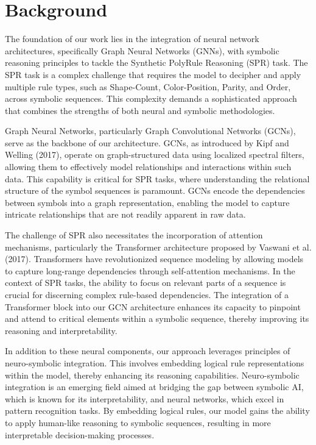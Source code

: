 \documentclass{article}
\begin{document}
\section{Background}
The foundation of our work lies in the integration of neural network architectures, specifically Graph Neural Networks (GNNs), with symbolic reasoning principles to tackle the Synthetic PolyRule Reasoning (SPR) task. The SPR task is a complex challenge that requires the model to decipher and apply multiple rule types, such as Shape-Count, Color-Position, Parity, and Order, across symbolic sequences. This complexity demands a sophisticated approach that combines the strengths of both neural and symbolic methodologies.

Graph Neural Networks, particularly Graph Convolutional Networks (GCNs), serve as the backbone of our architecture. GCNs, as introduced by Kipf and Welling (2017), operate on graph-structured data using localized spectral filters, allowing them to effectively model relationships and interactions within such data. This capability is critical for SPR tasks, where understanding the relational structure of the symbol sequences is paramount. GCNs encode the dependencies between symbols into a graph representation, enabling the model to capture intricate relationships that are not readily apparent in raw data.

The challenge of SPR also necessitates the incorporation of attention mechanisms, particularly the Transformer architecture proposed by Vaswani et al. (2017). Transformers have revolutionized sequence modeling by allowing models to capture long-range dependencies through self-attention mechanisms. In the context of SPR tasks, the ability to focus on relevant parts of a sequence is crucial for discerning complex rule-based dependencies. The integration of a Transformer block into our GCN architecture enhances its capacity to pinpoint and attend to critical elements within a symbolic sequence, thereby improving its reasoning and interpretability.

In addition to these neural components, our approach leverages principles of neuro-symbolic integration. This involves embedding logical rule representations within the model, thereby enhancing its reasoning capabilities. Neuro-symbolic integration is an emerging field aimed at bridging the gap between symbolic AI, which is known for its interpretability, and neural networks, which excel in pattern recognition tasks. By embedding logical rules, our model gains the ability to apply human-like reasoning to symbolic sequences, resulting in more interpretable decision-making processes.
\end{document}
